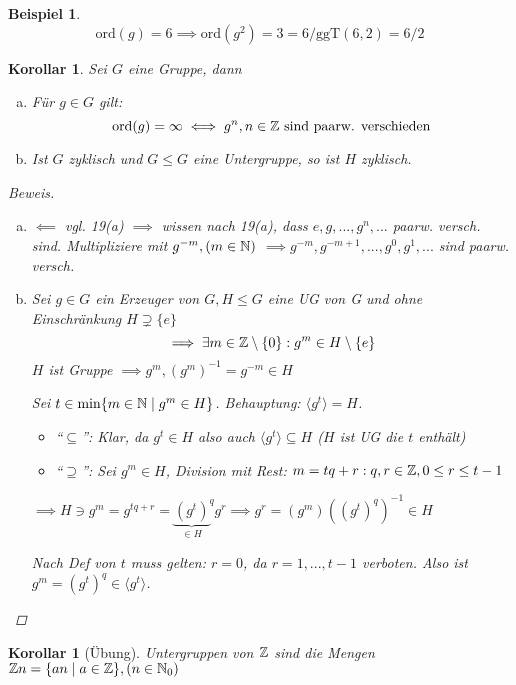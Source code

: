 \documentclass[a4paper]{report}
\theoremstyle{plain}
\newtheorem{kor}[thm]{Korollar}
\theoremstyle{definition}
\newtheorem*{bsp*}{Beispiel}
\begin{document}
\begin{bsp*}
$$\mathrm{ord}(g) = 6 \implies \mathrm{ord}(g^{2}) = 3 = 6/\mathrm{ggT}(6,2) = 6/2$$
\end{bsp*}

\begin{kor}
  Sei $G$ eine Gruppe, dann
  \begin{enumerate}[(a)]
    \item Für $g \in G$ gilt: $$\mathrm{ord}(g)= \infty \iff g^{n}, n \in \Bbb Z \text{ sind paarw. verschieden}$$
    \item Ist $G$ zyklisch und $G \le G$ eine Untergruppe, so ist $H$ zyklisch.
  \end{enumerate}
\begin{proof}[Beweis]
\item
  \begin{enumerate}[(a)]
\item $\impliedby$ vgl. 19(a)
$\implies$ wissen nach 19(a), dass $e, g, ..., g^{n}, ...$ paarw. versch. sind. Multipliziere mit $g^{-m},(m \in \Bbb N)$
$\implies g^{-m}, g^{-m+1}, ..., g^{0}, g^{1}, ...$ sind paarw. versch.
\item Sei $g \in G$ ein Erzeuger von $G, H \le G$ eine UG von G und ohne Einschränkung $H \supsetneq \{e\}$
$$\implies \exists m \in \Bbb Z \setminus \{0\}:g^{m} \in H \setminus \{e\}$$
$H$ ist Gruppe $\implies g^{m}, (g^{m})^{-1} = g^{-m} \in H$

Sei $t \in \min\{m \in \Bbb N \mid g^{m} \in H\}$. Behauptung: $\langle g^{t} \rangle = H$.
\begin{itemize}
\item ``$\subseteq$'': Klar, da $g^{t} \in H$ also auch $\langle g^{t} \rangle \subseteq H$ ($H$ ist UG die $t$ enthält)
\item ``$\supseteq$'': Sei $g^{m} \in H$, Division mit Rest: $m = tq + r:  q, r \in \Bbb Z, 0 \leq r \leq t-1$
\end{itemize}
$\implies H \ni g^{m} = g^{tq + r} = {\underbrace{(g^{t})}_{\in H}}^{q}g^{r} \implies g^{r} = (g^{m})((g^{t})^{q})^{-1} \in H$

          Nach Def von $t$ muss gelten: $r = 0$, da $r = 1, ..., t-1$ verboten.
Also ist $g^{m} = (g^{t})^{q} \in \langle g^{t} \rangle$.
  \end{enumerate}

\end{proof}


\end{kor}
\begin{kor}[Übung]
Untergruppen von $\Bbb Z$ sind die Mengen $\Bbb Zn = \{an \mid a \in \Bbb Z\}, (n \in \Bbb N_{0})$
\end{kor}
\end{document}
